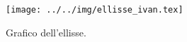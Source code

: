 \begin{figure}[h]\centering\texttt{[image: ../../img/ellisse\_ivan.tex]}\caption{Grafico dell'ellisse. }\label{fig:ellisse_ivan}\end{figure}
